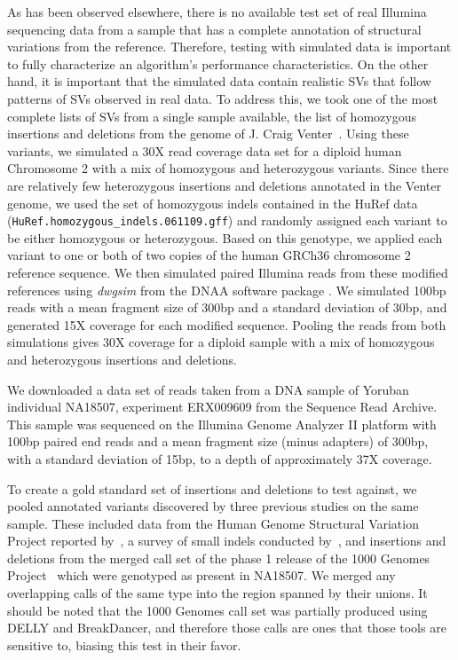 As has been observed elsewhere, there is no available test set of real Illumina sequencing data from a sample that has a complete annotation of structural variations from the reference. Therefore, testing with simulated data is important to fully characterize an algorithm's performance characteristics. On the other hand, it is important that the simulated data contain realistic SVs that follow patterns of SVs observed in real data. To address this, we took one of the most complete lists of SVs from a single sample available, the list of homozygous insertions and deletions from the genome of J. Craig Venter~\cite{Levy:2007fb}. Using these variants, we simulated a 30X read coverage data set for a diploid human Chromosome 2 with a mix of homozygous and heterozygous variants.  Since there are relatively few heterozygous insertions and deletions annotated in the Venter genome, we used the set of homozygous indels contained in the HuRef data (\texttt{HuRef.homozygous\_indels.061109.gff}) and randomly assigned each variant to be either homozygous or heterozygous. Based on this genotype, we applied each variant to one or both of two copies of the human GRCh36 chromosome 2 reference sequence. We then simulated paired Illumina reads from these modified references using \emph{dwgsim} from the DNAA software package \cite{DNAA}. We simulated 100bp reads with a mean fragment size of 300bp and a standard deviation of 30bp, and generated 15X coverage for each modified sequence. Pooling the reads from both simulations gives 30X coverage for a diploid sample with a mix of homozygous and heterozygous insertions and deletions.

We downloaded a data set of reads taken from a DNA sample of Yoruban individual NA18507, experiment ERX009609 from the Sequence Read Archive. This sample was sequenced on the Illumina Genome Analyzer II platform with 100bp paired end reads and a mean fragment size (minus adapters) of 300bp, with a standard deviation of 15bp, to a depth of approximately 37X coverage.

To create a gold standard set of insertions and deletions to test against, we pooled annotated variants discovered by three previous studies on the same sample. These included data from the Human Genome Structural Variation Project reported by~\cite{Kidd:2008p926}, a survey of small indels conducted by~\cite{Mills:2011fi}, and insertions and deletions from the merged call set of the phase 1 release of the 1000 Genomes Project~\cite{GenomesProjectConsortium:2012co} which were genotyped as present in NA18507. We merged any overlapping calls of the same type into the region spanned by their unions. It should be noted that the 1000 Genomes call set was partially produced using DELLY and BreakDancer, and therefore those calls are ones that those tools are sensitive to, biasing this test in their favor.

